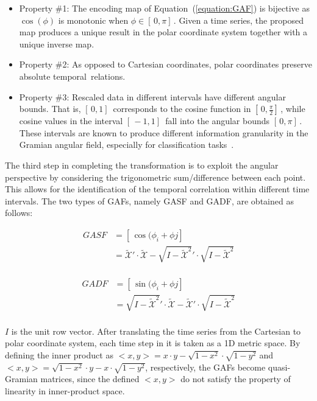 \begin{itemize}[leftmargin=*,labelsep=5.8mm]
\item {Property \#1}: The encoding map of Equation~(\ref{equation:GAF}) is bijective as $\cos(\phi)$ is monotonic when $\phi \in [\,0,\pi]\,$. Given a time series, the proposed map produces a unique result in the polar coordinate system together with a unique inverse map. 
\item {Property \#2}: As opposed to Cartesian coordinates, polar coordinates preserve absolute temporal~relations.
\item {Property \#3}: Rescaled data in different intervals have different angular bounds. That is, $[\,0,1]\,$ corresponds to the cosine function in $[\,0,\frac{\pi}{2}]\,$, while cosine values in the interval $[\,-1,1]\,$ fall into the angular bounds $[\,0,\pi]\,$. These intervals are known to produce different information granularity in the Gramian angular field, especially for classification tasks~\cite{wang_imaging_2015}.
\end{itemize}

The third step in completing the transformation is to exploit the angular perspective by considering the trigonometric sum/difference between each point. This allows for the identification of the temporal correlation within different time intervals. The two types of GAFs, namely GASF and GADF, are obtained as follows:

\begin{equation}
\begin{aligned}
GASF &= [\,\cos(\phi_{i} + \phi{j}]\, \\
	 &= \widetilde{\mathcal{X}}' \cdot \widetilde{\mathcal{X}} - \sqrt{I-\widetilde{\mathcal{X}}^2}' \cdot \sqrt{I-\widetilde{\mathcal{X}}^2}
\end{aligned}
\end{equation}
\\
\begin{equation}
\begin{aligned}
GADF &= [\,\sin(\phi_{i} + \phi{j}]\, \\
	 &= \sqrt{I-\widetilde{\mathcal{X}}^2}' \cdot \widetilde{\mathcal{X}} - \widetilde{\mathcal{X}}' \cdot \sqrt{I-\widetilde{\mathcal{X}}^2}\\
\end{aligned}
\end{equation}

$I$ is the unit row vector. After translating the time series from the Cartesian to polar coordinate system, each time step in it is taken as a 1D metric space. By defining the inner product as $<x,y> = x \cdot y - \sqrt{1-x^2} \cdot \sqrt{1-y^2}$ and $<x,y> = \sqrt{1-x^2} \cdot y - x \cdot \sqrt{1-y^2}$,
respectively, the GAFs become {quasi-Gramian} matrices, since the defined $<x,y>$ do not satisfy the property of linearity in inner-product space.


